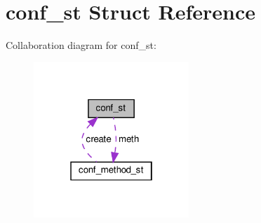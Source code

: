 \hypertarget{structconf__st}{}\section{conf\+\_\+st Struct Reference}
\label{structconf__st}


Collaboration diagram for conf\+\_\+st\+:
\nopagebreak
\begin{figure}[H]
\begin{center}
\leavevmode
\includegraphics[width=166pt]{structconf__st__coll__graph}
\end{center}
\end{figure}
